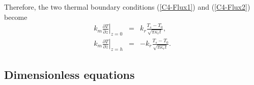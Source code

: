 Therefore, the  two thermal  boundary conditions  (\ref{C4-Flux1}) and
(\ref{C4-Flux2}) become
\begin{eqnarray}
  k_m\left.\frac{\partial                                    T}{\partial
  z}\right|_{z=0}&=& k_r
                     \frac{T_{s}-T_{0}}{\sqrt{\pi \kappa_r t}}  ,\label{C4-2Flux_1}\\
  k_m\left.\frac{\partial                                    T}{\partial
  z}\right|_{z=h}&=& -k_r
                     \frac{T_{s}-T_{0}}{\sqrt{\pi \kappa_r t}}.
                     \label{C4-2Flux_2}
\end{eqnarray}


\subsection{Dimensionless equations}
\label{C4-sec:dimens-equat-1}

